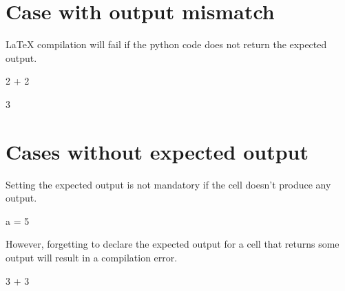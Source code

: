 \documentclass[oneside]{book}
\begin{document}
\chapter{Case with output mismatch}

LaTeX compilation will fail if the python code does not return the expected output.

\begin{pycell}
2 + 2
\end{pycell}
\begin{pyexpectedoutput}
3
\end{pyexpectedoutput}

\chapter{Cases without expected output}

Setting the expected output is not mandatory if the cell doesn't produce any output.

\begin{pycell}
a = 5
\end{pycell}

However, forgetting to declare the expected output for a cell that returns some output will result in a compilation error.
\begin{pycell}
3 + 3
\end{pycell}

\ifPythonTeXLoaded
\else
\fi
\end{document}
